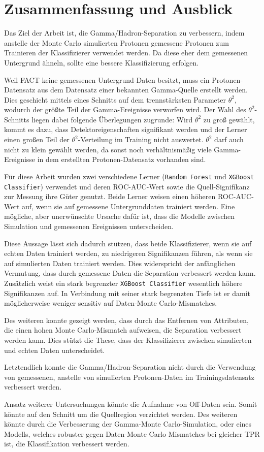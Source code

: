 \chapter{Zusammenfassung und Ausblick}
Das Ziel der Arbeit ist, die Gamma/Hadron-Separation zu verbessern, indem anstelle der Monte Carlo simulierten Protonen gemessene Protonen zum Trainieren der Klassifizierer verwendet werden. 
Da diese eher dem gemessenen Untergrund ähneln, sollte eine bessere Klassifizierung erfolgen.

Weil FACT keine gemessenen Untergrund-Daten besitzt, muss ein Protonen-Datensatz aus dem Datensatz einer bekannten Gamma-Quelle erstellt werden. 
Dies geschieht mittels eines Schnitts auf dem trennstärksten Parameter $\theta^{2}$, wodurch der größte Teil der Gamma-Ereignisse verworfen wird.
Der Wahl des $\theta^{2}$-Schnitts liegen dabei folgende Überlegungen zugrunde:
Wird $\theta^{2}$ zu groß gewählt, kommt es dazu, dass Detektoreigenschaften signifikant werden und der Lerner einen großen Teil der $\theta^{2}$-Verteilung im Training nicht auswertet. 
$\theta^{2}$ darf auch nicht zu klein gewählt werden, da sonst noch verhältnismäßig viele Gamma-Ereignisse in dem erstellten Protonen-Datensatz vorhanden sind.

Für diese Arbeit wurden zwei verschiedene Lerner (\texttt{Random Forest} und \texttt{XGBoost Classifier}) verwendet und deren ROC-AUC-Wert sowie die Quell-Signifikanz zur Messung ihre Güter genutzt. 
Beide Lerner weisen einen höheren ROC-AUC-Wert auf, wenn sie auf gemessene Untergrunddaten trainiert werden.
Eine mögliche, aber unerwünschte Ursache dafür ist, dass die Modelle zwischen Simulation und gemessenen Ereignissen unterscheiden.

Diese Aussage lässt sich dadurch stützen, dass beide Klassifizierer, wenn sie auf echten Daten trainiert werden, zu niedrigeren Signifikanzen führen, als wenn sie auf simulierten Daten trainiert werden. 
Dies widerspricht der anfänglichen Vermutung, dass durch gemessene Daten die Separation verbessert werden kann. 
Zusätzlich weist ein stark begrenzter \texttt{XGBoost Classifier} wesentlich höhere Signifikanzen auf. 
In Verbindung mit seiner stark begrenzten Tiefe ist er damit möglicherweise weniger sensitiv auf Daten-Monte Carlo-Mismatches. 

Des weiteren konnte gezeigt werden, dass durch das Entfernen von Attributen, die einen hohen Monte Carlo-Mismatch aufweisen, die Separation verbessert werden kann. 
Dies stützt die These, dass der Klassifizierer zwischen simulierten und echten Daten unterscheidet.

Letztendlich konnte die Gamma/Hadron-Separation nicht durch die Verwendung von gemessenen, anstelle von simulierten Protonen-Daten im Trainingsdatensatz verbessert werden. 

Ansatz weiterer Untersuchungen könnte die Aufnahme von Off-Daten sein.
Somit könnte auf den Schnitt um die Quellregion verzichtet werden. 
Des weiteren könnte durch die Verbesserung der Gamma-Monte Carlo-Simulation, oder eines Modells, welches robuster gegen Daten-Monte Carlo Mismatches bei gleicher TPR ist, die Klassifikation verbessert werden.
